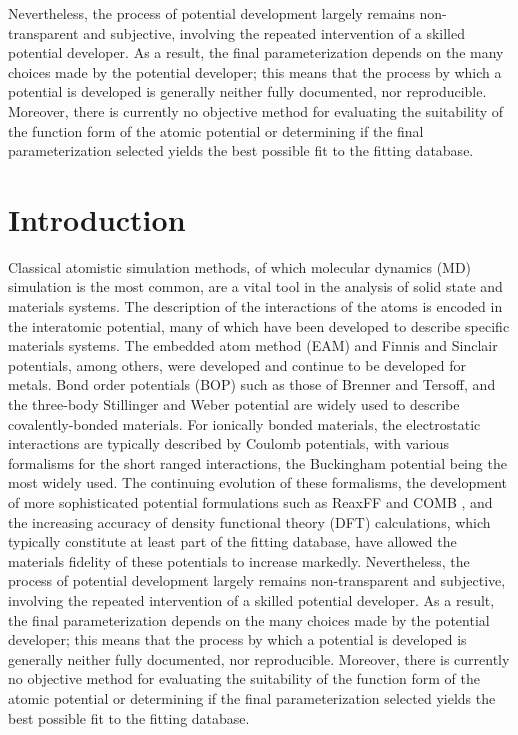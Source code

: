 Nevertheless, the process of potential development largely remains non-transparent and subjective, involving the repeated intervention of a skilled potential developer.\cite{martinez2013_fitting,martinez2016_posmat}
As a result, the final parameterization depends on the many choices made by the potential developer; this means that the process by which a potential is developed is generally neither fully documented, nor reproducible. Moreover, there is currently no objective method for evaluating the suitability of the function form of the atomic potential or determining if the final parameterization selected yields the best possible fit to the fitting database.

\section{Introduction}
Classical atomistic simulation methods, of which molecular dynamics (MD) simulation\cite{allen1987_md,haile1992_md,lesar2013_md,frenkel2002_md} is the most common, are a vital tool in the analysis of solid state and materials systems.
The description of the interactions of the atoms is encoded in the interatomic potential, many of which have been developed to describe specific materials systems.
The embedded atom method (EAM)\cite{daw1983_eam,daw1984_eam,daw1993_eam_review,foiles2012_eam_review} and Finnis and Sinclair\cite{finnis1984_fs} potentials, among others, were developed and continue to be developed for metals.
Bond order potentials (BOP) such as those of Brenner\cite{brenner1989_bop,brenner2002_rebo} and Tersoff\cite{tersoff1988_tersoff}, and the three-body Stillinger and Weber\cite{stillinger1985_sw} potential are widely used to describe covalently-bonded materials.
For ionically bonded materials, the electrostatic interactions are typically described by Coulomb potentials, with various formalisms for the short ranged interactions, the Buckingham potential being the most widely used.\cite{lewis1985_buck,gale1996_buck}
The continuing evolution of these formalisms, the development of more sophisticated potential formulations such as ReaxFF\cite{vanduin2001_reaxff,senftle2016_reaxff} and COMB \cite{liang2013_comb_1,liang2013_comb_2}, and the increasing accuracy of density functional theory (DFT) calculations, which typically constitute at least part of the fitting database, have allowed the materials fidelity of these potentials to increase markedly.
Nevertheless, the process of potential development largely remains non-transparent and subjective, involving the repeated intervention of a skilled potential developer.\cite{brenner2000_fitting,martinez2013_fitting,martinez2016_posmat}
As a result, the final parameterization depends on the many choices made by the potential developer; this means that the process by which a potential is developed is generally neither fully documented, nor reproducible.
Moreover, there is currently no objective method for evaluating the suitability of the function form of the atomic potential or determining if the final parameterization selected yields the best possible fit to the fitting database.

